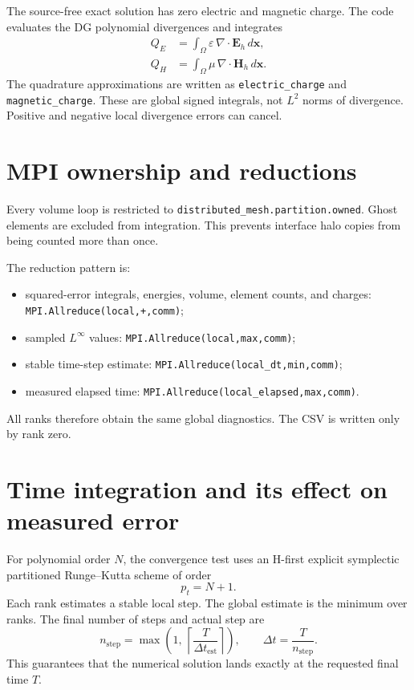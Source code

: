 \documentclass[11pt]{article}
\newcommand{\vect}[1]{\boldsymbol{#1}}
\newcommand{\code}[1]{\nolinkurl{#1}}
\newcommand{\Eh}{\vect E_h}
\newcommand{\Hh}{\vect H_h}
\begin{document}
The source-free exact solution has zero electric and magnetic charge. The
code evaluates the DG polynomial divergences and integrates
\begin{align}
  Q_E
    &=
    \int_\Omega
      \varepsilon\,\nabla\cdot\Eh\,d\vect x,\\
  Q_H
    &=
    \int_\Omega
      \mu\,\nabla\cdot\Hh\,d\vect x.
\end{align}
The quadrature approximations are written as
\code{electric_charge} and \code{magnetic_charge}. These are global signed
integrals, not \(L^2\) norms of divergence. Positive and negative local
divergence errors can cancel.

\section{MPI ownership and reductions}

Every volume loop is restricted to
\code{distributed_mesh.partition.owned}. Ghost elements are excluded from
integration. This prevents interface halo copies from being counted more
than once.

The reduction pattern is:
\begin{itemize}[leftmargin=*]
  \item squared-error integrals, energies, volume, element counts, and charges:
        \code{MPI.Allreduce(local,+,comm)};
  \item sampled \(L^\infty\) values:
        \code{MPI.Allreduce(local,max,comm)};
  \item stable time-step estimate:
        \code{MPI.Allreduce(local_dt,min,comm)};
  \item measured elapsed time:
        \code{MPI.Allreduce(local_elapsed,max,comm)}.
\end{itemize}

All ranks therefore obtain the same global diagnostics. The CSV is written
only by rank zero.

\section{Time integration and its effect on measured error}

For polynomial order \(N\), the convergence test uses an H-first explicit
symplectic partitioned Runge--Kutta scheme of order
\[
  p_t=N+1.
\]
Each rank estimates a stable local step. The global estimate is the minimum
over ranks. The final number of steps and actual step are
\[
  n_{\mathrm{step}}
    =
    \max\left(
      1,\,
      \left\lceil
        \frac{T}{\Delta t_{\mathrm{est}}}
      \right\rceil
    \right),
  \qquad
  \Delta t=\frac{T}{n_{\mathrm{step}}}.
\]
This guarantees that the numerical solution lands exactly at the requested
final time \(T\).
\end{document}
